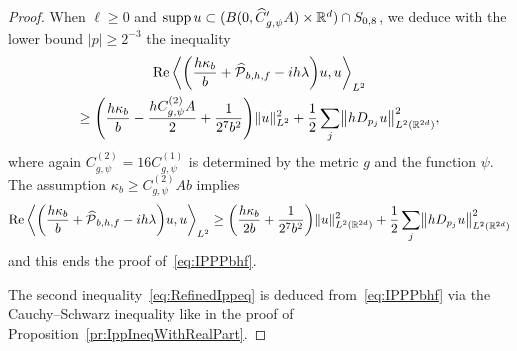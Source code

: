 \documentclass[10pt]{amsart}
\theoremstyle{definition}\newtheorem{defi}[theo]{Definition}\newtheorem{rema}[theo]{Remark}\newtheorem{exam}[theo]{Example}\newtheorem{exem}[theo]{Example}\newtheorem{nota}[theo]{Notation}
\newcommand{\R}{\mathbb{R}}
\newcommand{\clP}{\mathcal{P}}
\DeclareMathOperator{\Ree}{Re}
\DeclareMathOperator{\suppp}{supp}
\let\oldhat\hat
\renewcommand*{\hat}[1]{\mathchoice{\widehat{#1}}{\widehat{#1}}{\oldhat{#1}}{\oldhat{#1}}}
\let\originalleft\left
\let\originalright\right
\renewcommand{\left}{\mathopen{}\mathclose\bgroup\originalleft}
\renewcommand{\right}{\aftergroup\egroup\originalright}
\begin{document}
\begin{proof}
When $\ell\geq 0$ and $\suppp u\subset (B(0,\hat{C}'_{g,\psi}A)\times \R^d)\cap S_{0,8}$, we deduce with the lower bound $|p|\geq 2^{-3}$ the inequality
\begin{multline*}
\Ree\, \left\langle \left(\frac{h\kappa_b}{b} + \hat{\clP}_{b,h,f}-i h\lambda \right) u, u \right\rangle_{L^2} \\
\geq \left(\frac{h\kappa_b}{b}- \frac{hC_{g,\psi}^{(2)}A}{2} + \frac{1}{2^7b^{2}}\right) \|u\|_{L^2}^2
+ \frac{1}{2} \sum_j \left\| hD_{p_j} u \right\|_{L^2(\R^{2d})}^2,
\end{multline*}
where again $C_{g,\psi}^{(2)}=16 C_{g,\psi}^{(1)}$ is determined by the metric $g$ and the function $\psi$. The assumption $\kappa_{b}\geq C_{g,\psi}^{(2)}Ab$ implies
\[
\Ree\, \left\langle \left(\frac{h\kappa_b}{b} + \hat{\clP}_{b,h,f}-i h\lambda \right) u, u \right\rangle_{L^2} \geq \left(\frac{h\kappa_b}{2b}+\frac{1}{2^7b^{2}}\right) \|u\|_{L^2(\R^{2d})}^2 + \frac{1}{2} \sum_j \left\| hD_{p_j} u \right\|_{L^2(\R^{2d})}^2
\]
and this ends the proof of~\eqref{eq:IPPPbhf}.

The second inequality~\eqref{eq:RefinedIppeq} is deduced from~\eqref{eq:IPPPbhf} via the Cauchy--Schwarz inequality like in the proof of Proposition~\ref{pr:IppIneqWithRealPart}.
\end{proof}
\end{document}

